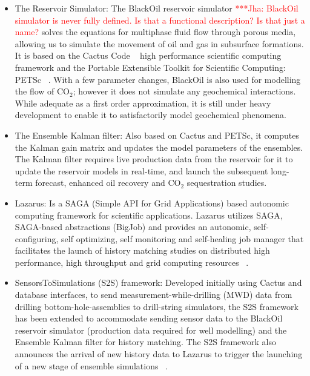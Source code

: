 \documentclass[10pt,conference,final]{IEEEtran}
\newcommand{\jhanote}[1]{ {\textcolor{red} { ***Jha: #1 }}}
\newcommand{\jhanote}[1]{}
\begin{document}
\begin{itemize}
\item The Reservoir Simulator: The BlackOil reservoir simulator \jhanote{BlackOil simulator is never fully defined. Is that a functional description? Is that just a name?} solves the equations for multiphase fluid flow through porous media, allowing us to simulate the movement of oil and gas in subsurface formations. It is based on the Cactus Code ~\cite{cactus_web} high performance scientific computing framework and the Portable Extensible Toolkit for Scientific Computing: PETSc ~\cite{PETSc}. With a few parameter changes, BlackOil is also used for modelling the flow of CO$_2$; however it does not simulate any geochemical interactions. While adequate as a first order approximation, it is still under heavy development to enable it to satisfactorily model geochemical phenomena.

\item The Ensemble Kalman filter: Also based on Cactus and PETSc, it computes the Kalman 
gain matrix and updates the model parameters of the ensembles. The Kalman filter requires 
live production data from the reservoir for it to update the reservoir models in 
real-time, and launch the subsequent long-term forecast, enhanced oil recovery and CO$_2$ 
sequestration studies.

\item Lazarus: Is a SAGA (Simple API for Grid Applications) based autonomic computing 
framework for scientific applications. Lazarus utilizes SAGA, SAGA-based 
abstractions (BigJob) and provides an autonomic, self-configuring, self optimizing, self 
monitoring and self-healing job manager that facilitates the launch of history matching 
studies on distributed high performance, high throughput and grid computing resources 
~\cite{gmac}.

\item SensorsToSimulations (S2S) framework: Developed initially using Cactus and database interfaces, to send measurement-while-drilling (MWD) data from drilling bottom-hole-assemblies to drill-string simulators, the S2S framework has been extended to accommodate sending sensor data to the BlackOil reservoir simulator (production data required for well modelling) and the Ensemble Kalman filter for history matching. The S2S framework also announces the arrival of new history data to Lazarus to trigger the launching of a new stage of ensemble simulations ~\cite{Duff2,Duff1}.

\end{itemize}
\end{document}
